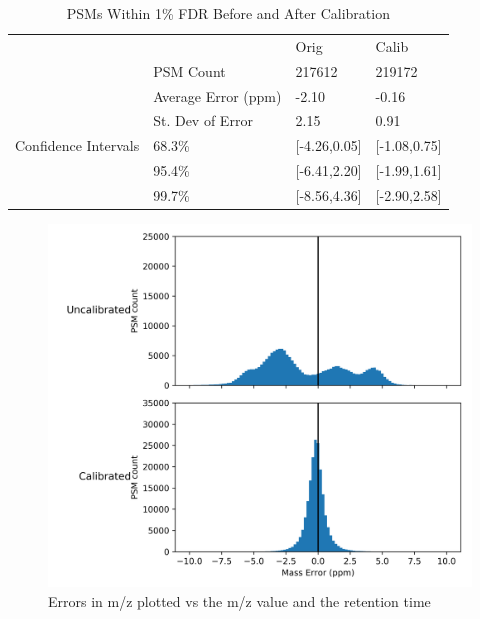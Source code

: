 \documentclass[journal=jprobs,manuscript=article]{achemso}
\begin{document}
\begin{table}[]
\centering
\caption{PSMs Within 1\% FDR Before and After Calibration}
\label{tbl:calib}
\begin{tabular}{llll}

                                                                                &      & Orig        & Calib        \\
 &PSM Count                                                           &      217612   &   219172        \\
 &Average Error (ppm)                                                              &      -2.10      &        -0.16      \\
 &St. Dev of Error                                                    &       2.15      &        0.91      \\
Confidence Intervals& 68.3\%     &    [-4.26,0.05]          &  [-1.08,0.75]            \\
                                                                                & 95.4\%      &   [-6.41,2.20]          &      [-1.99,1.61]         \\
                                                                                & 99.7\%       &    [-8.56,4.36]          &      [-2.90,2.58]         \\
\end{tabular}
\end{table}

\begin{figure}[H]
 \includegraphics{fig2-10ppmSearchCalib.png}
 \caption{Errors in m/z plotted vs the m/z value and the retention time}
 \label{fgr:fig2-10ppmSearchCalib}
\end{figure}
\end{document}
